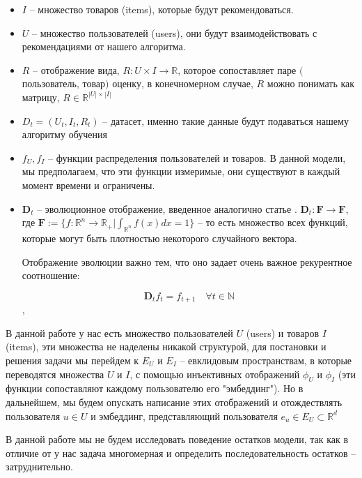\documentclass{article}
\begin{document}
\renewcommand{\labelitemi}{•} 
\begin{itemize}
    \item $I$ – множество товаров (items), которые будут рекомендоваться.

    
    \item  $U$ – множество пользователей (users), они будут взаимодействовать с рекомендациями от нашего алгоритма. 

    \item $R$ – отображение вида, $R : U \times I \rightarrow \mathbb{R}$, которое сопоставляет паре $($пользователь, товар$)$ оценку, в конечномерном случае, $R$ можно понимать как матрицу, $R \in \mathbb{R}^{|U| \times |I| }$

    \item $D_t = (U_t, I_t, R_t)$ – датасет, именно такие данные будут подаваться нашему алгоритму обучения 

    \item $f_U, f_I$ – функции распределения пользователей и товаров. В данной модели, мы предполагаем, что эти функции измеримые, они существуют в каждый момент времени и ограничены. 
    
    \item $\mathbf{D}_t$ – эволюционное отображение, введенное аналогично статье \cite{veprikov2024mathematical}.
    $\mathbf{D}_t: \mathbf{F} \rightarrow \mathbf{F}$, где 
    $\mathbf{F} := \big\{ f: \mathbb{R}^n \rightarrow \mathbb{R}_{+} | \int_{\mathbb{R}^n} f(x) dx = 1  \big\}$ – то есть множество всех функций, которые могут быть плотностью некоторого случайного вектора. 

    Отображение эволюции важно тем, что оно задает очень важное рекурентное соотношение: 
    
    $$\mathbf{D}_t f_t = f_{t+1} \quad\forall t \in \mathbb{N}$$, 

\end{itemize}
В данной работе у нас есть множество пользователей $U$ (users) и товаров $I$ (items), эти множества не наделены никакой структурой, для постановки и решения задачи мы перейдем к $E_U$ и $E_I$ – евклидовым пространствам, в которые переводятся множества $U$ и $I$, с помощью инъективных отображений $\phi_U $ и $\phi_I$ (эти функции сопоставляют каждому пользователю его "эмбеддинг"). Но в дальнейшем, мы будем опускать написание этих отображений и отождествлять пользователя $u \in U$ и эмбеддинг, представляющий пользователя $e_u \in E_U \subset \mathbb{R}^d$

В данной работе мы не будем исследовать поведение остатков модели, так как в отличие от \cite{veprikov2024mathematical} у нас задача многомерная и определить последовательность остатков – затруднительно. 
\end{document}

